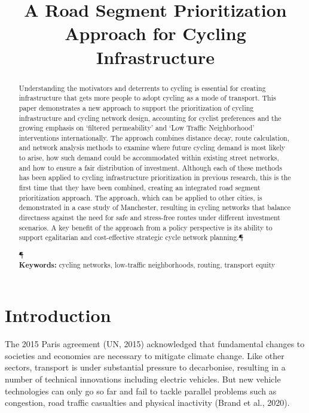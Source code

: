 \documentclass[
]{article}
\title{A Road Segment Prioritization Approach for Cycling Infrastructure}
\author{}
\date{\vspace{-2.5em}}
\providecommand{\DIFdeltex}[1]{{\protect\color{red}\sout{#1}}}                      %
\providecommand{\DIFaddbegin}{} %
\providecommand{\DIFaddend}{} %
\providecommand{\DIFdelbegin}{} %
\providecommand{\DIFdelend}{} %
\providecommand{\DIFdel}[1]{\texorpdfstring{\DIFdeltex{#1}}{}} %
\newcommand{\DIFscaledelfig}{0.5}
\newlength{\DIFdelgraphicswidth} %
\newlength{\DIFdelgraphicsheight} %
\newcommand{\DIFaddincludegraphics}[2][]{{\color{blue}\fbox{\DIFOincludegraphics[#1]{#2}}}} %
\newcommand{\DIFdelincludegraphics}[2][]{%
\sbox{\DIFdelgraphicsbox}{\DIFOincludegraphics[#1]{#2}}%
\settoboxwidth{\DIFdelgraphicswidth}{\DIFdelgraphicsbox} %
\settoboxtotalheight{\DIFdelgraphicsheight}{\DIFdelgraphicsbox} %
\scalebox{\DIFscaledelfig}{%
\parbox[b]{\DIFdelgraphicswidth}{\usebox{\DIFdelgraphicsbox}\\[-\baselineskip] \rule{\DIFdelgraphicswidth}{0em}}\llap{\resizebox{\DIFdelgraphicswidth}{\DIFdelgraphicsheight}{%
\setlength{\unitlength}{\DIFdelgraphicswidth}%
\begin{picture}(1,1)%
\thicklines\linethickness{2pt} %
{\color[rgb]{1,0,0}\put(0,0){\framebox(1,1){}}}%
{\color[rgb]{1,0,0}\put(0,0){\line( 1,1){1}}}%
{\color[rgb]{1,0,0}\put(0,1){\line(1,-1){1}}}%
\end{picture}%
}\hspace*{3pt}}} %
} %
\DeclareRobustCommand{\DIFaddbegin}{\DIFOaddbegin \let\includegraphics\DIFaddincludegraphics} %
\DeclareRobustCommand{\DIFaddend}{\DIFOaddend \let\includegraphics\DIFOincludegraphics} %
\DeclareRobustCommand{\DIFdelbegin}{\DIFOdelbegin \let\includegraphics\DIFdelincludegraphics} %
\DeclareRobustCommand{\DIFdelend}{\DIFOaddend \let\includegraphics\DIFOincludegraphics} %
\begin{document}
\maketitle
\begin{abstract}
Understanding the motivators and deterrents to cycling is essential for creating infrastructure that gets more people to adopt cycling as a mode of transport. This paper demonstrates a new approach to support the prioritization of cycling infrastructure and cycling network design, accounting for cyclist preferences and the growing emphasis on `filtered permeability' and `Low Traffic Neighborhood' interventions internationally. The approach combines distance decay, route calculation, and network analysis methods to examine where future cycling demand is most likely to arise, how such demand could be accommodated within existing street networks, and how to ensure a fair distribution of investment. Although each of these methods has been applied to cycling infrastructure prioritization in previous research, this is the first time that they have been combined, creating an integrated road segment prioritization approach. The approach, which can be applied to other cities, is demonstrated in a case study of Manchester, resulting in cycling networks that balance directness against the need for safe and stress-free routes under different investment scenarios. A key benefit of the approach from a policy perspective is its ability to support egalitarian and cost-effective strategic cycle network planning.\DIFdelbegin \DIFdel{¶ }\DIFdelend \DIFaddbegin \\
\DIFaddend \par\DIFdelbegin \DIFdel{¶ }\DIFdelend \DIFaddbegin \\
\DIFaddend \textbf{Keywords:} cycling networks, low-traffic neighborhoods, routing, transport equity
\end{abstract}

\hypertarget{introduction}{%
\section{Introduction}\label{introduction}}

The 2015 Paris agreement (UN, 2015) acknowledged that fundamental changes to societies and economies are necessary to mitigate climate change.
Like other sectors, transport is under substantial pressure to decarbonise, resulting in a number of technical innovations including electric vehicles.
But new vehicle technologies can only go so far and fail to tackle parallel problems such as congestion, road traffic casualties and physical inactivity (Brand et al., 2020).
\end{document}
